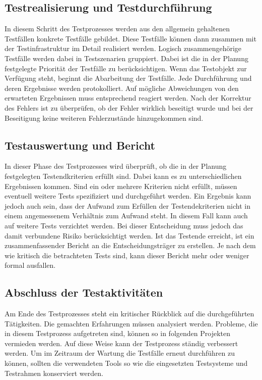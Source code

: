 \subsection{Testrealisierung und Testdurchführung}
\label{subsec:testrealisierung_und_durchführung}
In diesem Schritt des Testprozesses werden aus den allgemein gehaltenen Testfällen konkrete Testfälle gebildet. Diese Testfälle können dann zusammen mit der Testinfrastruktur im Detail realisiert werden. Logisch zusammengehörige Testfälle werden dabei in Testszenarien gruppiert. Dabei ist die in der Planung festgelegte Priorität der Testfälle zu berücksichtigen.
Wenn das Testobjekt zur Verfügung steht, beginnt die Abarbeitung der Testfälle. Jede Durchführung und deren Ergebnisse werden protokolliert. Auf mögliche Abweichungen von den erwarteten Ergebnissen muss entsprechend reagiert werden. Nach der Korrektur des Fehlers ist zu überprüfen, ob der Fehler wirklich beseitigt wurde und bei der Beseitigung keine weiteren Fehlerzustände hinzugekommen sind.

\subsection{Testauswertung und Bericht}
\label{subsec:testauswertung_und_bericht}
In dieser Phase des Testprozesses wird überprüft, ob die in der Planung festgelegten Testendkriterien erfüllt sind. Dabei kann es zu unterschiedlichen Ergebnissen kommen.
Sind ein oder mehrere Kriterien nicht erfüllt, müssen eventuell weitere Tests spezifiziert und durchgeführt werden. Ein Ergebnis kann jedoch auch sein, dass der Aufwand zum Erfüllen der Testendekriterien nicht in einem angemessenem Verhältnis zum Aufwand steht. In diesem Fall kann auch auf weitere Tests verzichtet werden. Bei dieser Entscheidung muss jedoch das damit verbundene Risiko berücksichtigt werden.
Ist das Testende erreicht, ist ein zusammenfassender Bericht an die Entscheidungsträger zu erstellen. Je nach dem wie kritisch die betrachteten Tests sind, kann dieser Bericht mehr oder weniger formal ausfallen.

\subsection{Abschluss der Testaktivitäten}
\label{subsec:abschluss_der_testaktivitäten}
Am Ende des Testprozesses steht ein kritischer Rückblick auf die durchgeführten Tätigkeiten. Die gemachten Erfahrungen müssen analysiert werden. Probleme, die in diesem Testprozess aufgetreten sind, können so in folgenden Projekten vermieden werden.
Auf diese Weise kann der Testprozess ständig verbessert werden.
Um im Zeitraum der Wartung die Testfälle erneut durchführen zu können, sollten die verwendeten Tools so wie die eingesetzten Testsysteme und Testrahmen konserviert werden.


